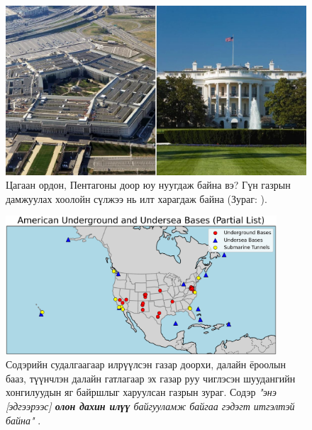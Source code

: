 \documentclass[10pt,twocolumn,letterpaper]{article}
\begin{document}
\begin{figure}[b]
\begin{center}
   \includegraphics[width=1\linewidth]{penta.jpg}
\end{center}
   \caption{Цагаан ордон, Пентагоны доор юу нуугдаж байна вэ? Гүн газрын дамжуулах хоолойн сүлжээ нь илт харагдаж байна (Зураг: \cite{31}).}
\label{fig:3}
\label{fig:onecol}
\end{figure}
\begin{figure}[t]
\begin{center}
\includegraphics[width=0.9\textwidth]{basescrop.png}
\end{center}
\caption{Содэрийн судалгаагаар илрүүлсэн газар доорхи, далайн ёроолын бааз, түүнчлэн далайн гатлагаар эх газар руу чиглэсэн шуудангийн хонгилуудын яг байршлыг харуулсан газрын зураг. Содэр \textit{"энэ [эдгээрээс] \textbf{олон дахин илүү} байгууламж байгаа гэдэгт итгэлтэй байна"} \cite{22}.}
\label{fig:4}
\end{figure}
\end{document}
